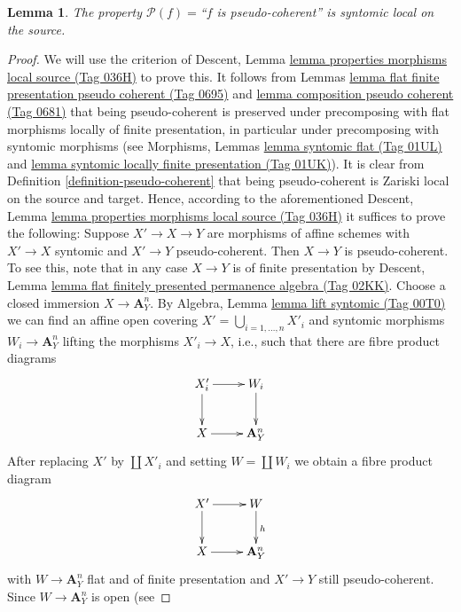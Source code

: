 \documentclass{amsart}
\theoremstyle{plain}
\newtheorem{lemma}[subsection]{Lemma}
\theoremstyle{definition}
\theoremstyle{remark}
\numberwithin{equation}{subsection}
\begin{document}
\begin{lemma}
\label{lemma-pseudo-coherent-syntomic-local-source}
The property $\mathcal{P}(f) =$``$f$ is pseudo-coherent''
is syntomic local on the source.
\end{lemma}

\begin{proof}
We will use the criterion of
Descent, Lemma \href{https://stacks.math.columbia.edu/tag/036H}{lemma properties morphisms local source (Tag 036H)}
to prove this. It follows from
Lemmas \href{https://stacks.math.columbia.edu/tag/0695}{lemma flat finite presentation pseudo coherent (Tag 0695)} and
\href{https://stacks.math.columbia.edu/tag/0681}{lemma composition pseudo coherent (Tag 0681)}
that being pseudo-coherent is preserved under precomposing with
flat morphisms locally of finite presentation, in particular under
precomposing with syntomic morphisms (see
Morphisms, Lemmas \href{https://stacks.math.columbia.edu/tag/01UL}{lemma syntomic flat (Tag 01UL)} and
\href{https://stacks.math.columbia.edu/tag/01UK}{lemma syntomic locally finite presentation (Tag 01UK)}).
It is clear from
Definition \ref{definition-pseudo-coherent}
that being pseudo-coherent is
Zariski local on the source and target.
Hence, according to the aforementioned
Descent, Lemma \href{https://stacks.math.columbia.edu/tag/036H}{lemma properties morphisms local source (Tag 036H)}
it suffices to prove the following: Suppose $X' \to X \to Y$ are
morphisms of affine schemes with $X' \to X$ syntomic and $X' \to Y$
pseudo-coherent. Then $X \to Y$ is pseudo-coherent.
To see this, note that in any case $X \to Y$ is of finite presentation by
Descent, Lemma \href{https://stacks.math.columbia.edu/tag/02KK}{lemma flat finitely presented permanence algebra (Tag 02KK)}.
Choose a closed immersion $X \to \mathbf{A}^n_Y$. By
Algebra, Lemma \href{https://stacks.math.columbia.edu/tag/00T0}{lemma lift syntomic (Tag 00T0)}
we can find an affine open covering $X' = \bigcup_{i = 1, \ldots, n} X'_i$
and syntomic morphisms $W_i \to \mathbf{A}^n_Y$ lifting the morphisms
$X'_i \to X$, i.e., such that there are fibre product diagrams
$$
\xymatrix{
X'_i \ar[d] \ar[r] & W_i \ar[d] \\
X \ar[r] & \mathbf{A}^n_Y
}
$$
After replacing $X'$ by $\coprod X'_i$ and setting $W = \coprod W_i$
we obtain a fibre product diagram
$$
\xymatrix{
X' \ar[d] \ar[r] & W \ar[d]^h \\
X \ar[r] & \mathbf{A}^n_Y
}
$$
with $W \to \mathbf{A}^n_Y$ flat and of finite presentation and
$X' \to Y$ still pseudo-coherent. Since
$W \to \mathbf{A}^n_Y$ is open (see

\end{proof}
\end{document}
